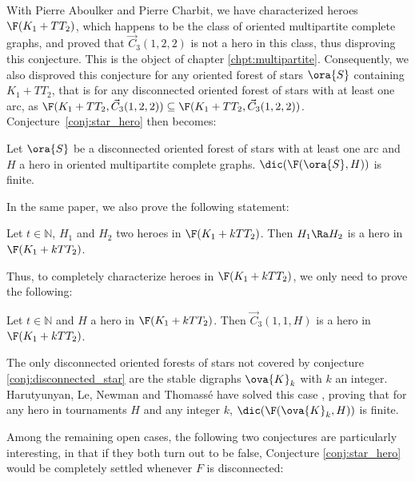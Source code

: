 \medskip

With Pierre Aboulker and Pierre Charbit, we have characterized heroes $\F(K_1 + TT_2)$, which happens to be the class of oriented multipartite complete graphs, and proved that $\vec C_{3}(1,2,2)$ is not a hero in this class, thus disproving this conjecture. This is the object of chapter \ref{chpt:multipartite}. Consequently, we also disproved this conjecture for any oriented forest of stars $\ora{S}$ containing $K_1 + TT_2$, that is for any disconnected oriented forest of stars with at least one arc, as  $\F(K_1 + TT_2, \vec C_{3}(1,2,2)) \subseteq \F(K_1 + TT_2, \vec C_{3}(1,2,2))$. Conjecture~\ref{conj:star_hero} then becomes:

\begin{conjecture}\label{conj:disconnected_star}
    Let $\ora{S}$ be a disconnected oriented forest of stars with at least one arc and $H$ a hero in oriented multipartite complete graphs. $\dic(\F(\ora{S}, H))$ is finite.
\end{conjecture}

In the same paper, we also prove the following statement:
\begin{theorem}
    Let $t \in \mathbb{N}$, $H_1$ and $H_2$ two heroes in $\F(K_1 + kTT_2)$. Then $H_1 \Ra H_2$ is a hero in $\F(K_1 + kTT_2)$.
\end{theorem}

Thus, to completely characterize heroes in $\F(K_1 + kTT_2)$, we only need to prove the following:

\begin{conjecture}
    Let $t \in \mathbb{N}$ and $H$ a hero in $\F(K_1 + kTT_2)$. Then $\vec C_3(1, 1, H)$ is a hero in $\F(K_1 + kTT_2)$.
\end{conjecture}

\medskip

The only disconnected oriented forests of stars not covered by conjecture \ref{conj:disconnected_star} are the stable digraphs $\ova{K}_k$ with $k$ an integer. Harutyunyan, Le, Newman and Thomassé have solved this case \cite{HLNT19}, proving that for any hero in tournaments $H$ and any integer $k$, $\dic(\F(\ova{K}_k, H))$ is finite.

\medskip

Among the remaining open cases, the following two conjectures are particularly interesting, in that if they both turn out to be false, Conjecture \ref{conj:star_hero} would be completely settled whenever $F$ is disconnected:

